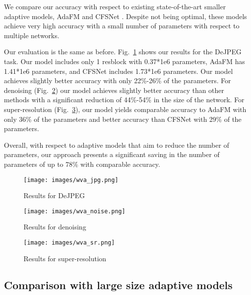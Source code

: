 \documentclass{article}
\begin{document}
We compare our accuracy with respect to existing state-of-the-art smaller adaptive models, AdaFM \cite{He_2019_CVPR} and CFSNet \cite{wang2019cfsnet}. Despite not being optimal, these models achieve very high accuracy with a small number of parameters with respect to multiple networks. 


Our evaluation is the same as before. Fig.~\ref{fig:weight_jpeg} shows our results for the DeJPEG task. Our model includes only 1 resblock with 0.37*1e6 parameters, AdaFM has 1.41*1e6 parameters, and CFSNet includes 1.73*1e6 parameters. Our model achieves slightly better accuracy with only 22\%-26\% of the parameters. For denoising (Fig.~\ref{fig:weight_noise}) our model achieves slightly better accuracy than other methods with a significant reduction of 44\%-54\% in the size of the network. For super-resolution (Fig.~\ref{fig:weight_sr}), our model yields comparable accuracy to AdaFM with only 36\% of the parameters and better accuracy than CFSNet with 29\% of the parameters. 

Overall, with respect to adaptive models that aim to reduce the number of parameters, our approach presents a significant saving in the number of parameters of up to 78\% with comparable accuracy. 

\begin{figure}[tb]
	\begin{center}
		\texttt{[image: images/wva\_jpg.png]}
	\end{center}
	\caption{Results for DeJPEG}
	\label{fig:weight_jpeg}
\end{figure}
\begin{figure}[tb]
	\begin{center}
		\texttt{[image: images/wva\_noise.png]}
	\end{center}
\caption{Results for denoising}
	\label{fig:weight_noise}
\end{figure}
\begin{figure}[tb]
	\begin{center}
		\texttt{[image: images/wva\_sr.png]}
	\end{center}
\caption{Results for super-resolution}
	\label{fig:weight_sr}
\end{figure}


 
\subsection{Comparison with large size adaptive models}
 
\end{document}
